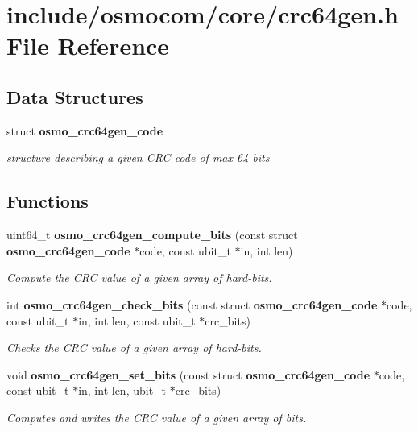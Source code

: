 \section{include/osmocom/core/crc64gen.h File Reference}
\label{crc64gen_8h}
\subsection*{Data Structures}
\begin{DoxyCompactItemize}
\item 
struct \textbf{ osmo\+\_\+crc64gen\+\_\+code}
\begin{DoxyCompactList}\small\item\em structure describing a given C\+RC code of max 64 bits \end{DoxyCompactList}\end{DoxyCompactItemize}
\subsection*{Functions}
\begin{DoxyCompactItemize}
\item 
uint64\+\_\+t \textbf{ osmo\+\_\+crc64gen\+\_\+compute\+\_\+bits} (const struct \textbf{ osmo\+\_\+crc64gen\+\_\+code} $\ast$code, const ubit\+\_\+t $\ast$in, int len)
\begin{DoxyCompactList}\small\item\em Compute the C\+RC value of a given array of hard-\/bits. \end{DoxyCompactList}\item 
int \textbf{ osmo\+\_\+crc64gen\+\_\+check\+\_\+bits} (const struct \textbf{ osmo\+\_\+crc64gen\+\_\+code} $\ast$code, const ubit\+\_\+t $\ast$in, int len, const ubit\+\_\+t $\ast$crc\+\_\+bits)
\begin{DoxyCompactList}\small\item\em Checks the C\+RC value of a given array of hard-\/bits. \end{DoxyCompactList}\item 
void \textbf{ osmo\+\_\+crc64gen\+\_\+set\+\_\+bits} (const struct \textbf{ osmo\+\_\+crc64gen\+\_\+code} $\ast$code, const ubit\+\_\+t $\ast$in, int len, ubit\+\_\+t $\ast$crc\+\_\+bits)
\begin{DoxyCompactList}\small\item\em Computes and writes the C\+RC value of a given array of bits. \end{DoxyCompactList}\end{DoxyCompactItemize}
